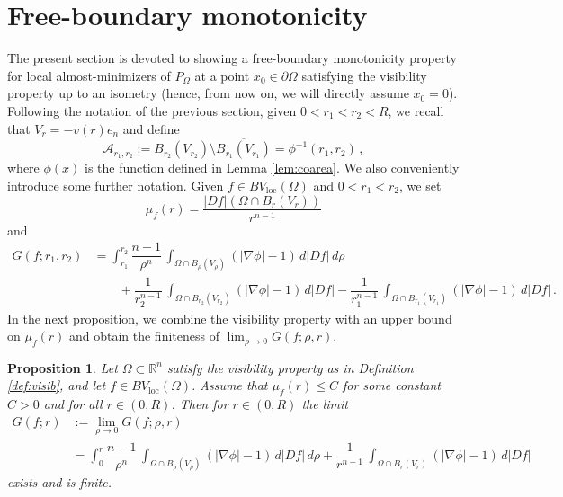 \documentclass[a4paper,reqno,11pt]{amsart}
\newtheorem{proposition}[theorem]{Proposition}
\newcommand{\R}{\mathbb{R}}
\newcommand{\de}{\partial}
\newcommand{\loc}{\mathop{\mathrm{loc}}}
\newcommand{\cA}{\mathcal{A}}
\newcommand{\pr}{P_{\Omega}}
\begin{document}
\section{Free-boundary monotonicity}
\label{sec:BMF}
The present section is devoted to showing a free-boundary monotonicity property for local almost-minimizers of $\pr$ at a point $x_0\in\de\Omega$ satisfying the visibility property up to an isometry (hence, from now on, we will directly assume $x_{0}=0$). 
Following the notation of the previous section, given $0 < r_{1} < r_{2} < R$, we recall that $V_{r}=-v(r)e_{n}$ and define
\begin{equation*}
\cA_{r_{1},r_{2}} := B_{r_{2}}(V_{r_{2}}) \setminus \overline{B_{r_{1}}(V_{r_{1}})} = \phi^{-1}(r_{1},r_{2})\,,
\end{equation*}
where $\phi(x)$ is the function defined in Lemma \ref{lem:coarea}. We also conveniently introduce some further notation. Given $f \in BV_{\loc}(\Omega)$ and $0<r_{1}<r_{2}$, we set
\[
\mu_{f}(r) = \dfrac{|Df|(\Omega \cap B_{r}(V_{r}))}{r^{n-1}}
\]
and
\begin{align} \label{eq:errtermfBV}
G(f;r_1, r_2) &= \int_{r_1}^{r_2} \dfrac{n-1}{\rho^{n}} \, \int_{\Omega \cap B_{\rho}(V_{\rho})} (|\nabla \phi| - 1) \, d |Df| \, d \rho \\ 
& \qquad + \dfrac{1}{r_{2}^{n-1}} \, \int_{\Omega \cap B_{r_{2}}(V_{r_2})} (|\nabla \phi| - 1) \, d|Df| - \dfrac{1}{r_{1}^{n-1}} \, \int_{\Omega \cap B_{r_1}(V_{r_1})} (|\nabla \phi| - 1) \, d|Df|  \, . \nonumber
\end{align}
%
In the next proposition, we combine the visibility property with an upper bound on $\mu_{f}(r)$ and obtain the finiteness of $\lim_{\rho\to 0} G(f;\rho,r)$.
\begin{proposition}\label{prop:Gbound1}
Let $\Omega \subset \R^{n}$ satisfy the visibility property as in Definition \ref{def:visib}, and let $f \in BV_{\loc}(\Omega)$. Assume that $\mu_{f}(r)\le C$ for some constant $C>0$ and for all $r\in (0,R)$. Then for $r\in (0,R)$ the limit
\begin{align*}%
G(f;r) &:= \lim_{\rho\to 0} G(f;\rho,r)\\\nonumber
&= \int_{0}^{r} \dfrac{n-1}{\rho^{n}} \, \int_{\Omega \cap B_{\rho}(V_{\rho})} (|\nabla \phi| - 1) \, d |Df| \, d \rho  + \dfrac{1}{r^{n-1}} \, \int_{\Omega \cap B_{r}(V_{r})} (|\nabla \phi| - 1) \, d|Df|  
\end{align*}
exists and is finite.
\end{proposition}
\end{document}
